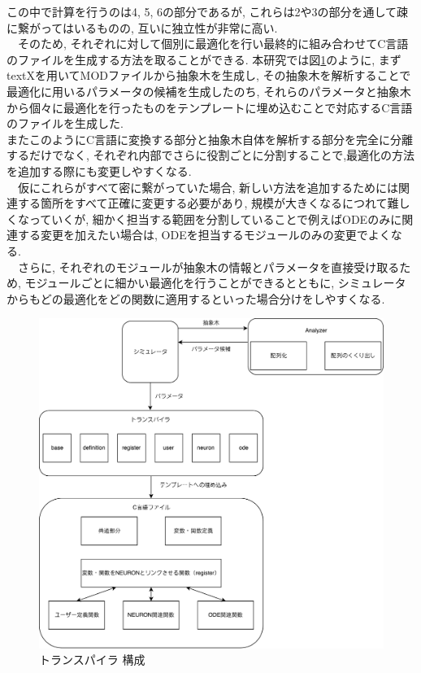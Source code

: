 この中で計算を行うのは4, 5, 6の部分であるが, これらは2や3の部分を通して疎に繋がってはいるものの,
互いに独立性が非常に高い.\\
　そのため, それぞれに対して個別に最適化を行い最終的に組み合わせてC言語のファイルを生成する方法を取ることができる.
本研究では図\ref{fig:transpiler}のように, まずtextXを用いてMODファイルから抽象木を生成し,
その抽象木を解析することで最適化に用いるパラメータの候補を生成したのち,
それらのパラメータと抽象木から個々に最適化を行ったものをテンプレートに埋め込むことで対応するC言語のファイルを生成した.\\

またこのようにC言語に変換する部分と抽象木自体を解析する部分を完全に分離するだけでなく,
それぞれ内部でさらに役割ごとに分割することで,最適化の方法を追加する際にも変更しやすくなる.\\
　仮にこれらがすべて密に繋がっていた場合, 新しい方法を追加するためには関連する箇所をすべて正確に変更する必要があり,
規模が大きくなるにつれて難しくなっていくが, 細かく担当する範囲を分割していることで例えばODEのみに関連する変更を加えたい場合は,
ODEを担当するモジュールのみの変更でよくなる.\\
　さらに, それぞれのモジュールが抽象木の情報とパラメータを直接受け取るため, モジュールごとに細かい最適化を行うことができるとともに,
シミュレータからもどの最適化をどの関数に適用するといった場合分けをしやすくなる.\\

\begin{figure}[htb]
  \begin{center}
    \includegraphics[width=1.1\textwidth]{./images/transpiler-image.pdf}
    \caption{トランスパイラ 構成}
    \label{fig:transpiler}
  \end{center}
\end{figure}~\\

